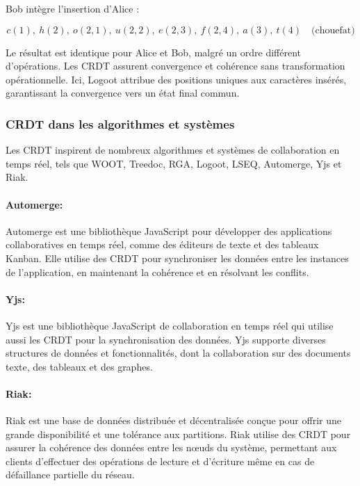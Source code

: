 Bob intègre l'insertion d'Alice :

\begin{equation}
    c(1), \ h(2), \ o(2, 1), \ u(2, 2), \ e(2, 3), \ f(2, 4), \ a(3), \ t(4) \quad \text{(chouefat)}
\end{equation}

Le résultat est identique pour Alice et Bob, malgré un ordre différent d'opérations. Les CRDT assurent convergence et cohérence sans transformation opérationnelle. Ici, Logoot attribue des positions uniques aux caractères insérés, garantissant la convergence vers un état final commun.
\subsubsection{CRDT dans les algorithmes et systèmes}
Les CRDT inspirent de nombreux algorithmes et systèmes de collaboration en temps réel, tels que WOOT, Treedoc, RGA, Logoot, LSEQ, Automerge, Yjs et Riak.

\paragraph{Automerge\cite{hardenbergAutomerge2023}: } Automerge est une bibliothèque JavaScript pour développer des applications collaboratives en temps réel, comme des éditeurs de texte et des tableaux Kanban. Elle utilise des CRDT pour synchroniser les données entre les instances de l'application, en maintenant la cohérence et en résolvant les conflits.

\paragraph{Yjs\cite{nicolaescuYjsFrameworkRealTime2015}: } Yjs est une bibliothèque JavaScript de collaboration en temps réel qui utilise aussi les CRDT pour la synchronisation des données. Yjs supporte diverses structures de données et fonctionnalités, dont la collaboration sur des documents texte, des tableaux et des graphes.

\paragraph{Riak\cite{amazon.comRiakDynamoAmazon2007}: } Riak est une base de données distribuée et décentralisée conçue pour offrir une grande disponibilité et une tolérance aux partitions. Riak utilise des CRDT pour assurer la cohérence des données entre les nœuds du système, permettant aux clients d'effectuer des opérations de lecture et d'écriture même en cas de défaillance partielle du réseau.

